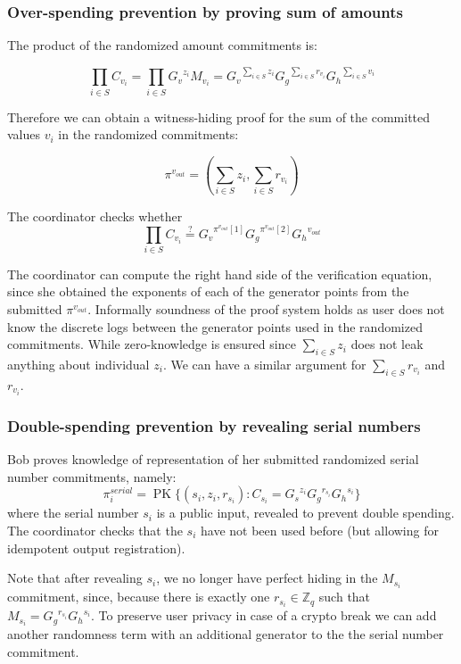 \documentclass{article}
\begin{document}
\subsubsection{Over-spending prevention by proving sum of amounts}

The product of the randomized amount commitments is:

\[\prod_{i \in S} C_{{v_i}}
= \prod_{i \in S} {G_v}^{z_i}M_{v_i}
= {G_v}^{\sum_{i \in S} z_i}{G_g}^{\sum_{i \in S} r_{v_i}}{G_h}^{\sum_{i \in S} v_i}
\]

Therefore we can obtain a witness-hiding proof for the sum of the committed values $v_i$ in the randomized commitments:

\[ \pi^{v_{out}}=\left(\sum_{i \in S}z_i,\sum_{i \in S}r_{v_i}\right) \]

The coordinator checks whether
\[
\prod_{i \in S} C_{v_i}
\stackrel{?}{=}
{G_v}^{\pi^{v_{out}}[1]} {G_g}^{\pi^{v_{out}}[2]} {G_h}^{v_{\mathit{out}}}
\]

The coordinator can compute the right hand side of the verification equation, since she obtained the exponents of each of the generator points from the submitted $\pi^{v_{out}}$. Informally soundness of the proof system holds as user does not know the discrete logs between the generator points used in the randomized commitments. While zero-knowledge is ensured since $\sum_{i \in S}z_i$ does not leak anything about individual $z_i$. We can have a similar argument for $\sum_{i \in S}r_{v_i}$ and $r_{v_i}$.

\subsubsection{Double-spending prevention by revealing serial numbers}

Bob proves knowledge of representation of her submitted randomized serial number commitments, namely:
\[
\pi_{i}^{\mathit{serial}}=\operatorname{PK}\{ (s_i, z_i, r_{s_i}):C_{s_i} = {G_s}^{z_i}{G_g}^{r_{s_i}}{G_h}^{s_i}
\}
\]
where the serial number $s_i$ is a public input, revealed to prevent double spending. The coordinator checks that the $s_i$ have not been used before (but allowing for idempotent output registration).

Note that after revealing $s_i$, we no longer have perfect hiding in the $M_{s_i}$ commitment, since, because there is exactly one $r_{s_i} \in \mathbb{Z}_q$ such that $M_{s_i} = {G_g}^{r_{s_i}} {G_h}^{s_i}$. To preserve user privacy in case of a crypto break we can add another randomness term with an additional generator to the the serial number commitment.



\end{document}

